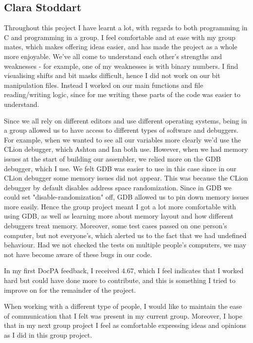 \documentclass[11pt]{article}
\begin{document}
\subsection*{Clara Stoddart}
Throughout this project I have learnt a lot, with regards to both programming in C and programming in a group. I feel comfortable and at ease with my group mates, which makes offering ideas easier, and has made the project as a whole more enjoyable. We've all come to understand each other's strengths and weaknesses - for example, one of my weaknesses is with binary numbers. I find visualising shifts and bit masks difficult, hence I did not work on our bit manipulation files. Instead I worked on our main functions and file reading/writing logic, since for me writing these parts of the code was easier to understand. 

Since we all rely on different editors and use different operating systems, being in a group allowed us to have access to different types of software and debuggers. For example, when we wanted to see all our variables more clearly we'd use the CLion debugger, which Ashton and Ian both use. However, when we had memory issues at the start of building our assembler, we relied more on the GDB debugger, which I use. We felt GDB was easier to use in this case since in our CLion debugger some memory issues did not appear. This was because the CLion debugger by default disables address space randomization. Since in GDB we could set "disable-randomization" off, GDB allowed us to pin down memory issues more easily. Hence the group project meant I got a lot more comfortable with using GDB, as well as learning more about memory layout and how different debuggers treat memory. Moreover, some test cases passed on one person's computer, but not everyone's, which alerted us to the fact that we had undefined behaviour. Had we not checked the tests on multiple people's computers, we may not have become aware of these bugs in our code.

In my first DocPA feedback, I received 4.67, which I feel indicates that I worked hard but could have done more to contribute, and this is something I tried to improve on for the remainder of the project. 

When working with a different type of people, I would like to maintain the ease of communication that I felt was present in my current group. Moreover, I hope that in my next group project I feel as comfortable expressing ideas and opinions as I did in this group project.
\end{document}
